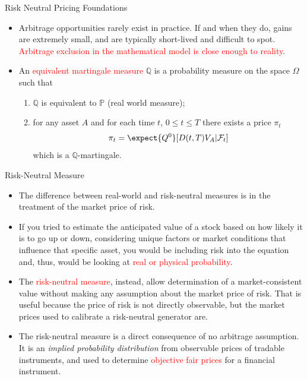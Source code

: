 \documentclass{beamer}
\begin{document}
\begin{frame}{Risk Neutral Pricing Foundations}
	\begin{itemize}
		\item Arbitrage opportunities rarely exist in practice. If and when they do, gains are extremely small, and are typically short-lived and difficult to spot. \textcolor{red}{Arbitrage exclusion in the mathematical model is close enough to reality}.
		\item An \textcolor{red}{equivalent martingale measure} $\mathbb{Q}$ is a probability measure on the space $\Omega$ such that
		\begin{enumerate}
			\item $\mathbb{Q}$ is equivalent to $\mathbb{P}$ (real world measure);
			\item for any asset $A$ and for each time $t$, $0\le t\le T$ there exists a price $\pi_t$
			\begin{equation*}
				\pi_t = \expect{Q^0}[D(t,T)V_A|\mathcal{F}_t]
			\end{equation*}
			which is a $\mathbb{Q}$-martingale.
		\end{enumerate}
	\end{itemize}
\end{frame}

\begin{frame}{Risk-Neutral Measure}
\begin{itemize}
\item  The difference between real-world and risk-neutral measures is in the treatment of the market price of risk.
\item If you tried to estimate the anticipated value of a stock based on how likely it is to go up or down, considering unique factors or market conditions that influence that specific asset, you would be including risk into the equation and, thus, would be looking at \textcolor{red}{real or physical probability}.
\item The \textcolor{red}{risk-neutral measure}, instead, allow determination of a market-consistent value without making any assumption about the market price of risk. That is useful because the price of risk is not directly observable, but the market prices used to calibrate a risk-neutral generator are.
\item The risk-neutral measure is a direct consequence of no arbitrage assumption. It is an \emph{implied probability distribution} from observable prices of tradable instruments, and used to determine \textcolor{red}{objective fair prices} for a financial instrument.
\end{itemize}
\end{frame}
\end{document}
